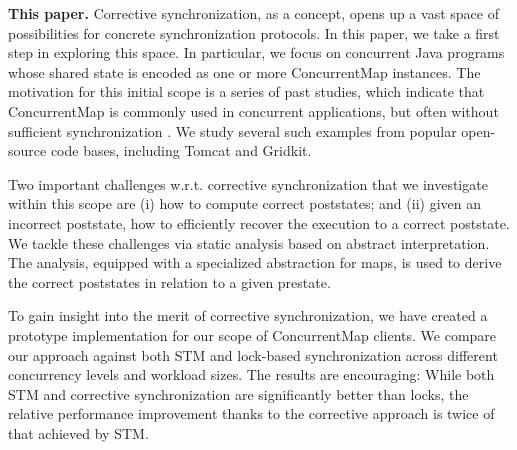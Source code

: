 \noindent \textbf{This paper.} Corrective synchronization, as a concept, opens up a vast space of possibilities for concrete synchronization protocols. In this paper, we take a first step in exploring this space. In particular, we focus on concurrent Java programs whose shared state is encoded as one or more {\sf ConcurrentMap} instances. The motivation for this initial scope is a series of past studies, which indicate that {\sf ConcurrentMap} is commonly used in concurrent applications, but often without sufficient synchronization \cite{oopsla/ShachamBASVY11,issta/ShachamYGABSV14}. We study several such examples from popular open-source code bases, including Tomcat and Gridkit.

Two important challenges w.r.t. corrective synchronization that we investigate within this scope are (i) how to compute correct poststates; and (ii) given an incorrect poststate, how to efficiently recover the execution to a correct poststate. 
We tackle these challenges via static analysis based on abstract interpretation. The analysis, equipped with a specialized abstraction for maps, is used to derive the correct poststates in relation to a given prestate. 

To gain insight into the merit of corrective synchronization, we have created a prototype implementation for our scope of {\sf ConcurrentMap} clients. We compare our approach against both STM and lock-based synchronization across different concurrency levels and workload sizes. The results are encouraging: While both STM and corrective synchronization are significantly better than locks, the relative performance improvement thanks to the corrective approach is twice of that achieved by STM.
%
%
%
%

